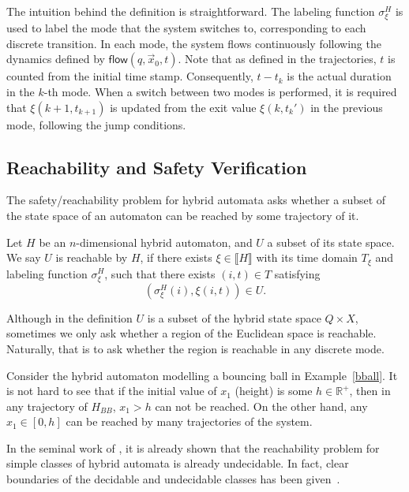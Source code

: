 \documentclass[envcountsect]{llncs}
\newcommand{\flow}{\mathsf{flow}}
\begin{document}
The intuition behind the definition is straightforward. The labeling function 
$\sigma_{\xi}^H$ is used to label the mode that the system switches to,
corresponding to each discrete transition. In each mode, the system flows
continuously following the dynamics defined by $\flow(q, \vec x_0, t)$. Note
that as defined in the trajectories, $t$ is counted from the initial time stamp.
Consequently, $t-t_k$ is the actual duration in the $k$-th mode. When a switch
between  two modes is performed, it is required that $\xi(k+1, t_{k+1})$ is
updated from the exit value $\xi(k, t_k')$ in the previous mode, following the
jump conditions.

\subsection{Reachability and Safety Verification}

The safety/reachability problem for hybrid automata asks whether a subset of 
the state space of an automaton can be reached by some trajectory of it. 
\begin{definition}[Reachability]\label{reachability}
Let $H$ be an $n$-dimensional hybrid automaton, and $U$ a subset of its state
space.  We say $U$ is reachable by $H$, if there exists $\xi\in\llbracket H
\rrbracket$ with its time domain $T_{\mathcal{\xi}}$ and labeling function
$\sigma_{\xi}^H$, such that there exists $(i,t)\in T$ satisfying
$$(\sigma^H_{\xi}(i), \xi(i,t))\in U.$$
\end{definition}

\begin{remark}
Although in the definition $U$ is a subset of the hybrid state space $Q\times
X$,  sometimes we only ask whether a region of the Euclidean space is reachable.
Naturally, that is to ask whether the region is reachable in any discrete mode. 
\end{remark}

\begin{example}
Consider the hybrid automaton modelling a bouncing ball in Example~\ref{bball}. 
It is not hard to see that if the initial value of $x_1$ (height) is some $h\in
\mathbb{R}^+$, then in any trajectory of $H_{BB}$, $x_1> h$ can not be reached.
On the other hand, any $x_1\in [0, h]$ can be reached by many trajectories of
the system. 
\end{example}

In the seminal work of \cite{DBLP:conf/rex/AlurD91,DBLP:conf/hybrid/AlurCHH92}, 
it is already shown that the reachability problem for simple classes of hybrid
automata is already undecidable. In fact, clear boundaries of the decidable and
undecidable classes has been given~\cite{DBLP:journals/jcss/HenzingerKPV98}.
\end{document}
